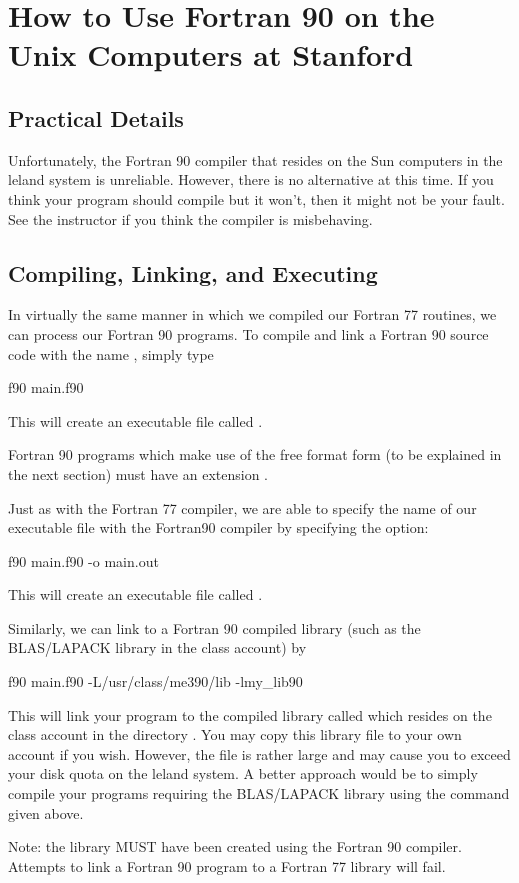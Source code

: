 \section{How to Use Fortran 90 on the Unix Computers at Stanford}

\subsection*{Practical Details}

Unfortunately, the Fortran 90 compiler that resides on the Sun computers
in the leland system is unreliable. However, there is no alternative at
this time. If you think your program should compile but it won't, then
it might not be your fault. See the instructor if you think the compiler
is misbehaving.


\subsection*{Compiling, Linking, and Executing}

In virtually the same manner in which we compiled our Fortran 77
routines, we can process our Fortran 90 programs. To compile and link a
Fortran 90 source code with the name , simply type

\begin{code}
f90 main.f90
\end{code}

This will create an executable file called .

Fortran 90 programs which make use of the free format form (to be
explained in the next section) must have an extension .

Just as with the Fortran 77 compiler, we are able to specify the name of
our executable file with the Fortran90 compiler by specifying the
 option:

\begin{code}
f90 main.f90 -o main.out
\end{code}

This will create an executable file called .

Similarly, we can link to a Fortran 90 compiled library (such as the
BLAS/LAPACK library in the class account) by

\begin{code}
f90 main.f90 -L/usr/class/me390/lib -lmy_lib90
\end{code}

This will link your program  to the compiled
library called  which resides on the class
account in the directory \ifmini{\\}{}.
You may copy this library file to your own account if you wish. However,
the file is rather large and may cause you to exceed your disk quota on
the leland system. A better approach would be to simply compile your
programs requiring the BLAS/LAPACK library using the command given
above.

Note: the library  MUST have been created
using the Fortran 90 compiler. Attempts to link a Fortran 90 program to
a Fortran 77 library will fail.
